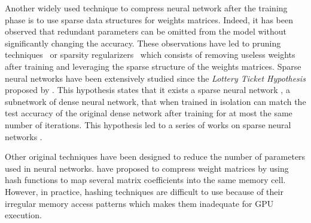 Another widely used technique to compress neural network after the training phase is to use sparse data structures for weights matrices.
Indeed, it has been observed that redundant parameters can be omitted from the model without significantly changing the accuracy.
These observations have led to pruning techniques~\cite{dai2018compressing,han2015deep,lin2017runtime} or sparsity regularizers~\cite{collins2014memory,dai2018compressing,liu2015sparse} which consists of removing useless weights after training and leveraging the sparse structure of the weights matrices.
Sparse neural networks have been extensively studied since the \emph{Lottery Ticket Hypothesis} proposed by \citet{frankle2018lottery}.
This hypothesis states that it exists a sparse neural network \ie, a subnetwork of dense neural network, that when trained in isolation can match the test accuracy of the original dense network after training for at most the same number of iterations.
This hypothesis led to a series of works on sparse neural networks \cite{zhou2019deconstructing,malach2019proving,evci2020rigging}.

Other original techniques have been designed to reduce the number of parameters used in neural networks. 
\citet{chen2015compressing} have proposed to compress weight matrices by using hash functions to map several matrix coefficients into the same memory cell.
However, in practice, hashing techniques are difficult to use because of their irregular memory access patterns which makes them inadequate for GPU execution.



%

%
%

%

